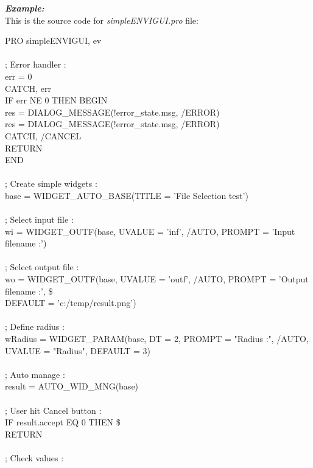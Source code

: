 \emph{\textbf{Example:}}\\
\indent This is the source code for \emph{simpleENVIGUI.pro} file:\\
\begin{scriptsize}
\indent PRO simpleENVIGUI, ev\\
\\
\indent ; Error handler :\\
\indent err = 0\\
\indent CATCH, err\\
\indent IF err NE 0 THEN BEGIN\\
\indent \indent res = DIALOG\_MESSAGE(!error\_state.msg, /ERROR)\\
\indent \indent res = DIALOG\_MESSAGE(!error\_state.msg, /ERROR)\\
\indent \indent CATCH, /CANCEL\\
\indent \indent RETURN\\
\indent END\\
\\
\indent ; Create simple widgets :\\
\indent base = WIDGET\_AUTO\_BASE(TITLE = 'File Selection test')\\
\\
\indent ; Select input file :\\
\indent wi = WIDGET\_OUTF(base, UVALUE = 'inf', /AUTO, PROMPT = 'Input filename :')\\
\\
\indent ; Select output file :\\
\indent wo = WIDGET\_OUTF(base, UVALUE = 'outf', /AUTO, PROMPT = 'Output filename :', \$\\
\indent DEFAULT = 'c:/temp/result.png')\\
\\
\indent ; Define radius :\\
\indent wRadius = WIDGET\_PARAM(base, DT = 2, PROMPT = "Radius :", /AUTO, UVALUE = "Radius",  DEFAULT = 3)\\
\\
\indent ; Auto manage :\\
\indent result = AUTO\_WID\_MNG(base)\\
\\
\indent ; User hit Cancel button :\\
\indent IF result.accept EQ 0 THEN \$\\
\indent \indent RETURN\\
\\
\indent ; Check values :\\

\end{scriptsize}
